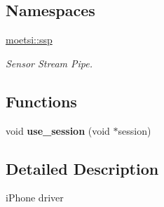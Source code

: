 \subsection*{Namespaces}
\begin{DoxyCompactItemize}
\item 
 \hyperlink{namespacemoetsi_1_1ssp}{moetsi\+::ssp}
\begin{DoxyCompactList}\small\item\em Sensor Stream Pipe. \end{DoxyCompactList}\end{DoxyCompactItemize}
\subsection*{Functions}
\begin{DoxyCompactItemize}
\item 
\mbox{\label{iphone__reader_8mm_aea1fc7a3a8cfe6ce9c958525ff814fba}} 
void {\bfseries use\+\_\+session} (void $\ast$session)
\end{DoxyCompactItemize}


\subsection{Detailed Description}
i\+Phone driver 

